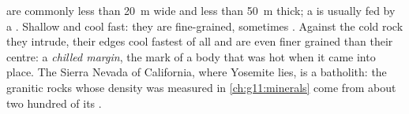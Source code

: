  are commonly less than \qty{20}{m} wide and  less than \qty{50}{m}
thick; a  is usually fed by a . Shallow  and  cool fast:
they are fine-grained, sometimes . Against the cold rock they
intrude, their edges cool fastest of all and are even finer grained than
their centre: a \emph{chilled margin}, the mark of a body that was hot when
it came into place. The Sierra Nevada of California, where Yosemite lies,
is a batholith: the granitic rocks whose density was measured in
\cref{ch:g11:minerals} come from about two hundred of its .


